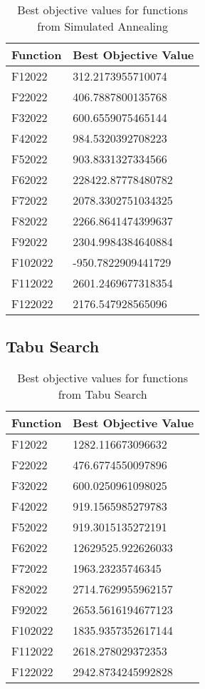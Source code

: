 \documentclass{report}
\begin{document}
\begin{table}[ht]
\centering
\begin{tabular}{ll}
\hline
\textbf{Function} & \textbf{Best Objective Value} \\
\hline
F12022  & 312.2173955710074 \\
F22022  & 406.7887800135768 \\
F32022  & 600.6559075465144 \\
F42022  & 984.5320392708223 \\
F52022  & 903.8331327334566 \\
F62022  & 228422.87778480782 \\
F72022  & 2078.3302751034325 \\
F82022  & 2266.8641474399637 \\
F92022  & 2304.9984384640884 \\
F102022 & -950.7822909441729 \\
F112022 & 2601.2469677318354 \\
F122022 & 2176.547928565096 \\
\hline
\end{tabular}
\caption{Best objective values for functions from Simulated Annealing}
\label{tab:sa_best_obj_values}
\end{table}

\subsection*{Tabu Search}

\begin{table}[ht]
\centering
\begin{tabular}{ll}
\hline
\textbf{Function} & \textbf{Best Objective Value} \\
\hline
F12022  & 1282.116673096632 \\
F22022  & 476.6774550097896 \\
F32022  & 600.0250961098025 \\
F42022  & 919.1565985279783 \\
F52022  & 919.3015135272191 \\
F62022  & 12629525.922626033 \\
F72022  & 1963.23235746345 \\
F82022  & 2714.7629955962157 \\
F92022  & 2653.5616194677123 \\
F102022 & 1835.9357352617144 \\
F112022 & 2618.278029372353 \\
F122022 & 2942.8734245992828 \\
\hline
\end{tabular}
\caption{Best objective values for functions from Tabu Search}
\label{tab:tabu_best_obj_values}
\end{table}
\end{document}
